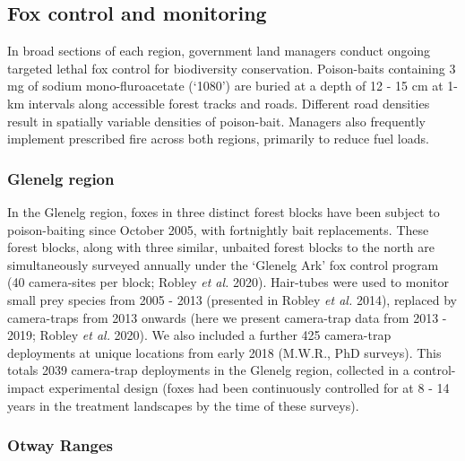 \documentclass[11pt,a4paper,titlepage,twoside,openright]{style/unimelbthesis}
\begin{document}
\begin{mainmatter}
\hypertarget{fox-control-and-monitoring}{%
\subsection{Fox control and monitoring}\label{fox-control-and-monitoring}}

In broad sections of each region, government land managers conduct ongoing targeted lethal fox control for biodiversity conservation. Poison-baits containing 3 mg of sodium mono-fluroacetate (`1080') are buried at a depth of 12 - 15 cm at 1-km intervals along accessible forest tracks and roads. Different road densities result in spatially variable densities of poison-bait. Managers also frequently implement prescribed fire across both regions, primarily to reduce fuel loads.

\hypertarget{glenelg-region-1}{%
\subsubsection{Glenelg region}\label{glenelg-region-1}}

In the Glenelg region, foxes in three distinct forest blocks have been subject to poison-baiting since October 2005, with fortnightly bait replacements. These forest blocks, along with three similar, unbaited forest blocks to the north are simultaneously surveyed annually under the `Glenelg Ark' fox control program (40 camera-sites per block; Robley \emph{et al.} 2020). Hair-tubes were used to monitor small prey species from 2005 - 2013 (presented in Robley \emph{et al.} 2014), replaced by camera-traps from 2013 onwards (here we present camera-trap data from 2013 - 2019; Robley \emph{et al.} 2020). We also included a further 425 camera-trap deployments at unique locations from early 2018 (M.W.R., PhD surveys). This totals 2039 camera-trap deployments in the Glenelg region, collected in a control-impact experimental design (foxes had been continuously controlled for at 8 - 14 years in the treatment landscapes by the time of these surveys).

\hypertarget{otway-ranges-1}{%
\subsubsection{Otway Ranges}\label{otway-ranges-1}}


\end{mainmatter}
\end{document}

